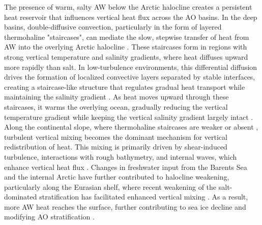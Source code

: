 \documentclass[draft]{agujournal2019}
\begin{document}
The presence of warm, salty AW below the Arctic halocline creates a persistent heat reservoir that influences vertical heat flux across the AO basins. In the deep basins, double-diffusive convection, particularly in the form of layered thermohaline "staircases", can mediate the slow, stepwise transfer of heat from AW into the overlying Arctic halocline \cite{Timmermans2008,shibley2017spatial}. These staircases form in regions with strong vertical temperature and salinity gradients, where heat diffuses upward more rapidly than salt. In low-turbulence environments, this differential diffusion drives the formation of localized convective layers separated by stable interfaces, creating a staircase-like structure that regulates gradual heat transport while maintaining the salinity gradient \cite{Radko_2013}. As heat moves upward through these staircases, it warms the overlying ocean, gradually reducing the vertical temperature gradient while keeping the vertical salinity gradient largely intact \cite{Rudels2008,polyakov2019}. Along the continental slope, where thermohaline staircases are weaker or absent \cite{shibley2017spatial}, turbulent vertical mixing becomes the dominant mechanism for vertical redistribution of heat. This mixing is primarily driven by shear-induced turbulence, interactions with rough bathymetry, and internal waves, which enhance vertical heat flux \cite{Rippeth2015,Polyakov2020,schulz2021}. Changes in freshwater input from the Barents Sea and the internal Arctic have further contributed to halocline weakening, particularly along the Eurasian shelf, where recent weakening of the salt-dominated stratification has facilitated enhanced vertical mixing \cite{Fer2009,Pemberton2016,Polyakov2020,Metzner2020}. As a result, more AW heat reaches the surface, further contributing to sea ice decline and modifying AO stratification \cite{Polyakov2017,Polyakov2020}.






\end{document}
